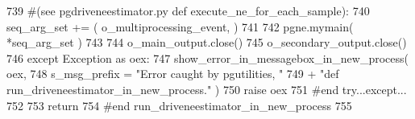 \begin{DoxyCode}
739         \textcolor{comment}{#(see pgdriveneestimator.py def execute\_ne\_for\_each\_sample):}
740         seq\_arg\_set += ( o\_multiprocessing\_event, )
741 
742         pgne.mymain( *seq\_arg\_set )
743 
744         o\_main\_output.close()
745         o\_secondary\_output.close()
746     \textcolor{keywordflow}{except} Exception \textcolor{keyword}{as} oex:
747         show\_error\_in\_messagebox\_in\_new\_process( oex, 
748                 s\_msg\_prefix = \textcolor{stringliteral}{"Error caught by pgutilities, "}
749                                 + \textcolor{stringliteral}{"def run\_driveneestimator\_in\_new\_process."} )
750         \textcolor{keywordflow}{raise} oex
751     \textcolor{comment}{#end try...except...}
752 
753     \textcolor{keywordflow}{return}
754 \textcolor{comment}{#end run\_driveneestimator\_in\_new\_process}
755 
\end{DoxyCode}
